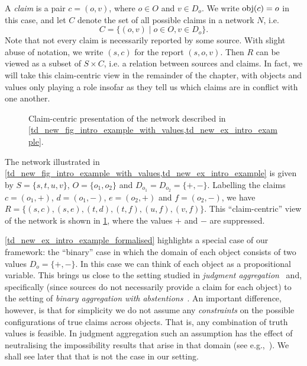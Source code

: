 A \emph{claim} is a pair $c = (o, v)$, where $o \in O$ and $v \in D_o$. We
write $\operatorname{obj}(c) = o$ in this case, and let $C$ denote the set of all possible
claims in a network $N$, i.e.
\[
    C = \{(o, v) \mid o \in O, v \in D_o\}.
\]
Note that not every claim is necessarily reported by some source. With slight
abuse of notation, we write $(s, c)$ for the report $(s, o, v)$. Then $R$ can
be viewed as a subset of $S \times C$, i.e. a relation between sources and
claims. In fact, we will take this claim-centric view in the remainder of the
chapter, with objects and values only playing a role insofar as they tell us
which claims are in conflict with one another.

\begin{figure}
    \centering
    \caption{
        Claim-centric presentation of the network described in
        \cref{td_new_fig_intro_example_with_values,td_new_ex_intro_example}.
    }
    \label{td_new_fig_intro_example}
\end{figure}

\begin{example}
    \label{td_new_ex_intro_example_formalised}
    The network illustrated in
    \cref{td_new_fig_intro_example_with_values,td_new_ex_intro_example} is
    given by $S = \{s, t, u, v\}$, $O = \{o_1, o_2\}$ and $D_{o_1} = D_{o_2} =
    \{+, -\}$. Labelling the claims $c = (o_1, +)$, $d = (o_1, -)$, $e = (o_2,
    +)$ and $f = (o_2, -)$, we have
    $
        R = \{
            (s, c), (s, e),
            (t, d), (t, f),
            (u, f),
            (v, f)
        \}
    $. This ``claim-centric'' view of the network is shown in
    \cref{td_new_fig_intro_example}, where the values $+$ and $-$ are
    suppressed.
\end{example}

\cref{td_new_ex_intro_example_formalised} highlights a special case of our
framework: the ``binary'' case in which the domain of each object consists of
two values $D_o = \{+, -\}$.  In this case we can
think of each object as a propositional variable. This brings us close to the
setting studied in \emph{judgment aggregation}~\cite{endriss2016ja} and,
specifically (since sources do not necessarily provide a claim for each
object) to the setting of \emph{binary aggregation with
abstentions}~\cite{christoffbinary,dokow}. An important difference, however, is
that for simplicity we do not assume any \emph{constraints} on the possible
configurations of true claims across objects. That is, any combination of truth
values is feasible. In judgment aggregation such an assumption has the effect
of neutralising the impossibility results that arise in that domain (see
e.g.,~\cite{christoffbinary}). We shall see later that that is not the case in
our setting.

